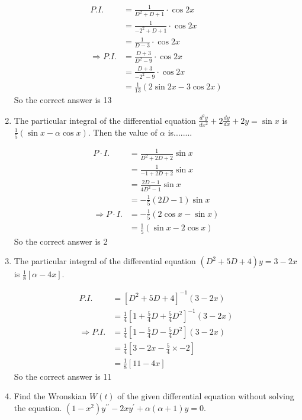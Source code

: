 \begin{enumerate}[label=\color{ocre}\textbf{\arabic*.}]
\begin{answer}
	\begin{align*}
	P.I. &=\frac{1}{D^{2}+D+1} \cdot \cos 2 x\\&=\frac{1}{-2^{2}+D+1} \cdot \cos 2 x\\&=\frac{1}{D-3} \cdot \cos 2 x\\
	\Rightarrow P . I .&=\frac{D+3}{D^{2}-9} \cdot \cos 2 x\\&=\frac{D+3}{-2^{2}-9} \cdot \cos 2 x\\&=\frac{1}{13}(2 \sin 2 x-3 \cos 2 x)
	\end{align*}
	So the correct answer is 13
\end{answer}
\item The particular integral of the differential equation $\frac{d^{2} y}{d x^{2}}+2 \frac{d y}{d x}+2 y=\sin x$ is $\frac{1}{5}(\sin x-\alpha \cos x) .$ Then the value of $\alpha$ is........
\begin{answer}
	\begin{align*}
	P \cdot I .&=\frac{1}{D^{2}+2 D+2} \sin x\\&=\frac{1}{-1+2 D+2} \sin x\\&=\frac{2 D-1}{4 D^{2}-1} \sin x\\&=-\frac{1}{5}(2 D-1) \sin x\\
	\Rightarrow P \cdot I .&=-\frac{1}{5}(2 \cos x-\sin x)\\&=\frac{1}{5}(\sin x-2 \cos x)
	\end{align*}
	So the correct answer is 2
\end{answer}
	\item The particular integral of the differential equation $\left(D^{2}+5 D+4\right) y=3-2 x$ is $\frac{1}{8}[\alpha-4 x]$.
\begin{answer}
	\begin{align*}
	P.I. &=\left[D^{2}+5 D+4\right]^{-1}(3-2 x)\\&=\frac{1}{4}\left[1+\frac{5}{4} D+\frac{5}{4} D^{2}\right]^{-1}(3-2 x)\\
	\Rightarrow P.I. &=\frac{1}{4}\left[1-\frac{5}{4} D-\frac{5}{4} D^{2}\right](3-2 x)\\&=\frac{1}{4}\left[3-2 x-\frac{5}{4} \times-2\right]\\&=\frac{1}{8}[11-4 x]
	\end{align*}
	So the correct answer is 11
\end{answer}
\item  Find the Wronskian $W(t)$ of the given differential equation without solving the equation. $\left(1-x^{2}\right) y ^{\prime \prime}-2 x y^{\prime} +\alpha(\alpha+1) y=0$.

\end{enumerate}
